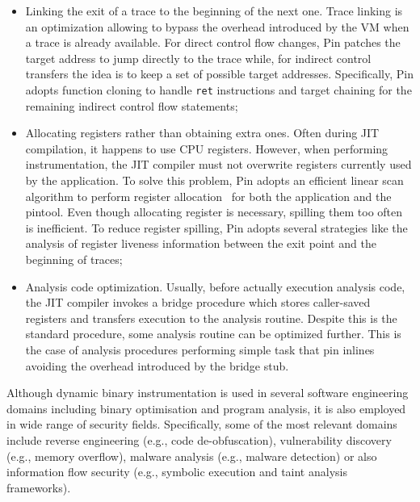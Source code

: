 \documentclass[LaM,binding=0.6cm]{sapthesis}
\begin{document}
\begin{itemize}
\item Linking the exit of a trace to the beginning of the next one. Trace linking is an optimization allowing to bypass the overhead introduced by the VM when a trace is already available. For direct control flow changes, Pin patches the target address to jump directly to the trace while, for indirect control transfers the idea is to keep a set of possible target addresses. Specifically, Pin adopts function cloning to handle \texttt{ret} instructions and target chaining for the remaining indirect control flow statements;
\item Allocating registers rather than obtaining extra ones. Often during JIT compilation, it happens to use CPU registers. However, when performing instrumentation, the JIT compiler must not overwrite registers currently used by the application. To solve this problem, Pin adopts an efficient linear scan algorithm to perform register allocation~\cite{poletto1999linear} for both the application and the pintool. Even though allocating register is necessary, spilling them too often is inefficient. To reduce register spilling, Pin adopts several strategies like the analysis of register liveness information between the exit point and the beginning of traces;
\item Analysis code optimization. Usually, before actually execution analysis code, the JIT compiler invokes a bridge procedure which stores caller-saved registers and transfers execution to the analysis routine. Despite this is the standard procedure, some analysis routine can be optimized further. This is the case of analysis procedures performing simple task that pin inlines avoiding the overhead introduced by the bridge stub.
\end{itemize}
Although dynamic binary instrumentation is used in several software engineering domains including binary optimisation and program analysis, it is also employed in wide range of security fields. Specifically, some of the most relevant domains include reverse engineering (e.g., code de-obfuscation), vulnerability discovery (e.g., memory overflow), malware analysis (e.g., malware detection) or also information flow security (e.g., symbolic execution and taint analysis frameworks).
\end{document}
